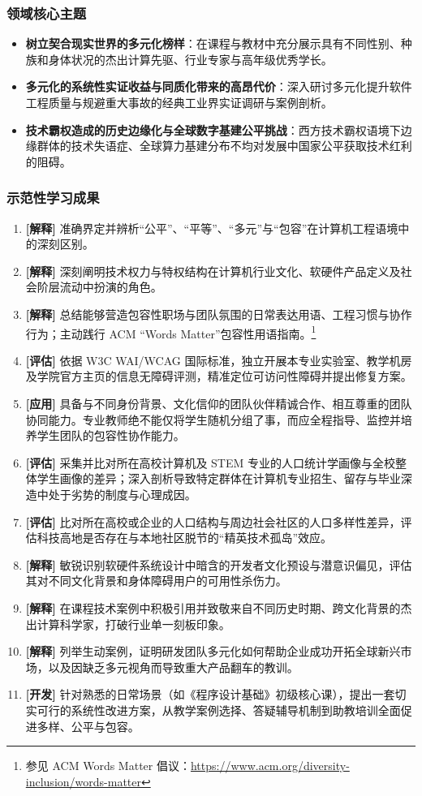 \subsubsection{领域核心主题}
\begin{itemize}
    \item \textbf{树立契合现实世界的多元化榜样}：在课程与教材中充分展示具有不同性别、种族和身体状况的杰出计算先驱、行业专家与高年级优秀学长。
    \item \textbf{多元化的系统性实证收益与同质化带来的高昂代价}：深入研讨多元化提升软件工程质量与规避重大事故的经典工业界实证调研与案例剖析。
    \item \textbf{技术霸权造成的历史边缘化与全球数字基建公平挑战}：西方技术霸权语境下边缘群体的技术失语症、全球算力基建分布不均对发展中国家公平获取技术红利的阻碍。
\end{itemize}

\subsubsection{示范性学习成果}
\begin{enumerate}
    \item \textbf{[解释]} 准确界定并辨析“公平”、“平等”、“多元”与“包容”在计算机工程语境中的深刻区别。
    \item \textbf{[解释]} 深刻阐明技术权力与特权结构在计算机行业文化、软硬件产品定义及社会阶层流动中扮演的角色。
    \item \textbf{[解释]} 总结能够营造包容性职场与团队氛围的日常表达用语、工程习惯与协作行为；主动践行 ACM “Words Matter”包容性用语指南。\footnote{参见 ACM Words Matter 倡议：\url{https://www.acm.org/diversity-inclusion/words-matter}}
    \item \textbf{[评估]} 依据 W3C WAI/WCAG 国际标准，独立开展本专业实验室、教学机房及学院官方主页的信息无障碍评测，精准定位可访问性障碍并提出修复方案。
    \item \textbf{[应用]} 具备与不同身份背景、文化信仰的团队伙伴精诚合作、相互尊重的团队协同能力。专业教师绝不能仅将学生随机分组了事，而应全程指导、监控并培养学生团队的包容性协作能力。
    \item \textbf{[评估]} 采集并比对所在高校计算机及 STEM 专业的人口统计学画像与全校整体学生画像的差异；深入剖析导致特定群体在计算机专业招生、留存与毕业深造中处于劣势的制度与心理成因。
    \item \textbf{[评估]} 比对所在高校或企业的人口结构与周边社会社区的人口多样性差异，评估科技高地是否存在与本地社区脱节的“精英技术孤岛”效应。
    \item \textbf{[解释]} 敏锐识别软硬件系统设计中暗含的开发者文化预设与潜意识偏见，评估其对不同文化背景和身体障碍用户的可用性杀伤力。
    \item \textbf{[解释]} 在课程技术案例中积极引用并致敬来自不同历史时期、跨文化背景的杰出计算科学家，打破行业单一刻板印象。
    \item \textbf{[解释]} 列举生动案例，证明研发团队多元化如何帮助企业成功开拓全球新兴市场，以及因缺乏多元视角而导致重大产品翻车的教训。
    \item \textbf{[开发]} 针对熟悉的日常场景（如《程序设计基础》初级核心课），提出一套切实可行的系统性改进方案，从教学案例选择、答疑辅导机制到助教培训全面促进多样、公平与包容。
\end{enumerate}

